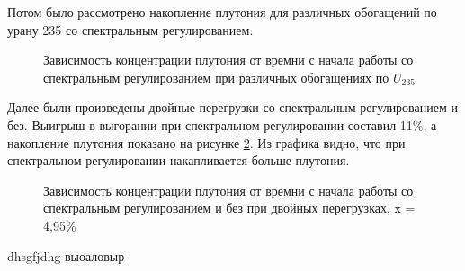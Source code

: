 \documentclass[a4paper]{article}
\begin{document}
	Потом было рассмотрено накопление плутония для различных обогащений по урану 235 со спектральным регулированием.
	\begin{figure}[h]
		\caption{Зависимость концентрации плутония от времни с начала работы со спектральным регулированием при различных обогащениях по $U_{235}$}
		\label{ris:pu2}
	\end{figure} 
	
	Далее были произведены двойные перегрузки со спектральным регулированием и без. Выигрыш в выгорании при спектральном регулировании составил 11\%, а накопление плутония показано на рисунке \ref{ris:pu2n}. Из графика видно, что при спектральном регулировании накапливается больше плутония.
	
	\begin{figure}[h]
		\caption{Зависимость концентрации плутония от времни с начала работы со спектральным регулированием и без при двойных перегрузках, x = 4,95\%}
		\label{ris:pu2n}
	\end{figure} 
dhsgfjdhg
выоаловыр
	
	
\end{document}
